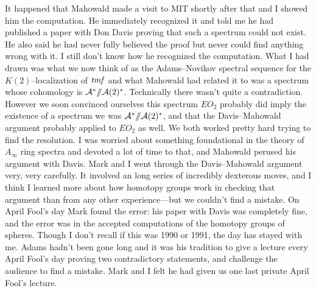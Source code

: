 It happened that Mahowald made a visit to MIT shortly after that and I
showed him the computation.  He immediately recognized it and told me
he had published a paper with Don Davis proving that such a spectrum
could not exist.  He also said he had never fully believed the proof
but never could find anything wrong with it.  I still don't know how
he recognized the computation.  What I had drawn was what we now think
of as the Adams--Novikov spectral sequence for the $K(2)$--localization
of $\mathit{tmf}$ and what Mahowald had related it to was a spectrum whose
cohomology is $\mathcal A^* /\!\!/ \mathcal A(2)^*$.
Technically there wasn't quite a contradiction.  However
we soon convinced ourselves this spectrum $EO_{2}$ probably did imply
the existence of a spectrum we was $\mathcal A^* /\!\!/ \mathcal A(2)^*$,
and that the
Davis--Mahowald argument probably applied to $EO_{2}$ as well.  We both
worked pretty hard trying to find the resolution.  I was worried about
something foundational in the theory of $A_{\infty}$ ring spectra and
devoted a lot of time to that, and Mahowald perused his argument with
Davis.  Mark and I went through the Davis--Mahowald argument very, very
carefully.  It involved an long series of incredibly dexterous moves,
and I think I learned more about how homotopy groups work in
checking that argument than from any other experience---but we
couldn't find a mistake.  On April Fool's day Mark found the
error: his paper with Davis was completely fine, and the error was in
the accepted computations of the homotopy groups of spheres.  Though I
don't recall if this was 1990 or 1991, the day has stayed with me.
Adams hadn't been gone long and it was his tradition to give a lecture
every April Fool's day proving two contradictory statements, and
challenge the audience to find a mistake.  Mark and I felt he had
given us one last private April Fool's lecture.

